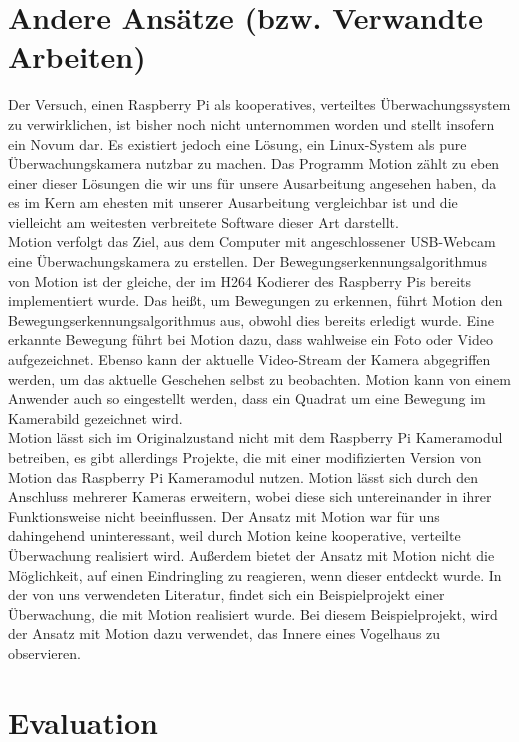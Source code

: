 \documentclass[journal]{IEEEtran}
\begin{document}
\section{Andere Ansätze (bzw. Verwandte Arbeiten)}
Der Versuch, einen Raspberry Pi als kooperatives, verteiltes Überwachungssystem zu verwirklichen, ist bisher noch nicht unternommen worden und stellt insofern ein Novum dar. Es existiert jedoch eine Lösung, ein Linux-System als pure Überwachungskamera nutzbar zu machen. Das Programm Motion \cite{motion} zählt zu eben einer dieser Lösungen die wir uns für unsere Ausarbeitung angesehen haben, da es im Kern am ehesten mit unserer Ausarbeitung vergleichbar ist und die vielleicht am weitesten verbreitete Software dieser Art darstellt. \\Motion verfolgt das Ziel, aus dem Computer mit angeschlossener USB-Webcam eine Überwachungskamera zu erstellen. Der Bewegungserkennungsalgorithmus von Motion ist der gleiche, der im H264 Kodierer des Raspberry Pis bereits implementiert wurde. Das heißt, um Bewegungen zu erkennen, führt Motion den Bewegungserkennungsalgorithmus aus, obwohl dies bereits erledigt wurde. Eine erkannte Bewegung führt bei Motion dazu, dass wahlweise ein Foto oder Video aufgezeichnet. Ebenso kann der aktuelle Video-Stream der Kamera abgegriffen werden, um das aktuelle Geschehen selbst zu beobachten. Motion kann von einem Anwender auch so eingestellt werden, dass ein Quadrat um eine Bewegung im Kamerabild gezeichnet wird. \\Motion lässt sich im Originalzustand nicht mit dem Raspberry Pi Kameramodul betreiben, es gibt allerdings Projekte, die mit einer modifizierten Version von Motion das Raspberry Pi Kameramodul nutzen. Motion lässt sich durch den Anschluss mehrerer Kameras erweitern, wobei diese sich untereinander in ihrer Funktionsweise nicht beeinflussen. Der Ansatz mit Motion war für uns dahingehend uninteressant, weil durch Motion keine kooperative, verteilte Überwachung realisiert wird. Außerdem bietet der Ansatz mit Motion nicht die Möglichkeit, auf einen Eindringling zu reagieren, wenn dieser entdeckt wurde. In der von uns verwendeten Literatur, findet sich ein Beispielprojekt einer Überwachung, die mit Motion realisiert wurde. Bei diesem Beispielprojekt, wird der Ansatz mit Motion dazu verwendet, das Innere eines Vogelhaus zu observieren.\cite{raspi}


\section{Evaluation}
\end{document}
